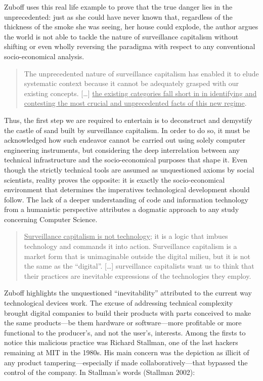 \documentclass[
  a4paper,
]{book}
\begin{document}
Zuboff uses this real life example to prove that the true danger lies in the unprecedented: just as she could have never known that, regardless of the thickness of the smoke she was seeing, her house could explode, the author argues the world is not able to tackle the nature of surveillance capitalism without shifting or even wholly reversing the paradigma with respect to any conventional socio-economical analysis.

\begin{quote}
The unprecedented nature of surveillance capitalism has enabled it to elude systematic context because it cannot be adequately grasped with our existing concepts. {[}\ldots{]} \uline{the existing categories fall short in in identifying and contesting the most crucial and unprecedented facts of this new regime}.
\end{quote}

Thus, the first step we are required to entertain is to deconstruct and demystify the castle of sand built by surveillance capitalism. In order to do so, it must be acknowledged how such endeavor cannot be carried out using solely computer engineering instruments, but considering the deep interrelation between any technical infrastructure and the socio-economical purposes that shape it. Even though the strictly technical tools are assumed as unquestioned axioms by social scientists, reality proves the opposite: it is exactly the socio-economical environment that determines the imperatives technological development should follow. The lack of a deeper understanding of code and information technology from a humanistic perspective attributes a dogmatic approach to any study concerning Computer Science.

\begin{quote}
\uline{Surveillance capitalism is not technology}; it is a logic that imbues technology and commands it into action. Surveillance capitalism is a market form that is unimaginable outside the digital milieu, but it is not the same as the ``digital''. {[}\ldots{]} surveillance capitalists want us to think that their practices are inevitable expressions of the technologies they employ.
\end{quote}

Zuboff highlights the unquestioned ``inevitability'' attributed to the current way technological devices work. The excuse of addressing technical complexity brought digital companies to build their products with parts conceived to make the same products---be them hardware or software---more profitable or more functional to the producer's, and not the user's, interests. Among the firsts to notice this malicious practice was Richard Stallman, one of the last hackers remaining at MIT in the 1980s. His main concern was the depiction as illicit of any product tampering---especially if made collaboratively---that bypassed the control of the company. In Stallman's words {(Stallman 2002)}:
\end{document}
